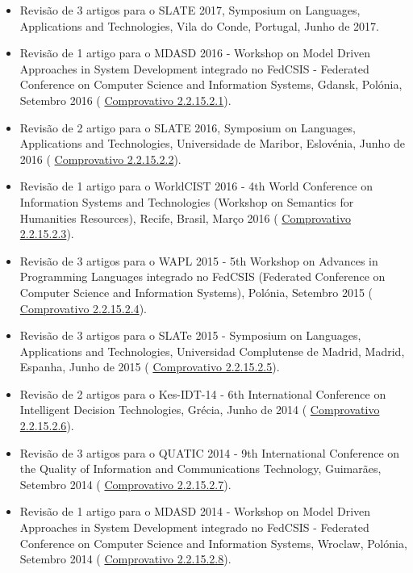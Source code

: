 \documentclass[11pt]{article}
\begin{document}
\begin{itemize}
\item{Revisão de 3 artigos para o SLATE 2017, Symposium on Languages, Applications and Technologies, Vila do Conde, Portugal, Junho de 2017.}
\item{Revisão de 1 artigo para o MDASD 2016 - Workshop on Model Driven Approaches in System Development integrado no FedCSIS - Federated Conference on Computer Science and Information Systems, Gdansk, Polónia, Setembro 2016 (
\href{run:ComprovativosCOCP/revisoes/MDASD2016.pdf}{Comprovativo 2.2.15.2.1}). }
\item{Revisão de 2 artigo para o SLATE 2016, Symposium on Languages, Applications and Technologies, Universidade de Maribor, Eslovénia, Junho de 2016 (
\href{run:ComprovativosCOCP/revisoes/SLATE2016.pdf}{Comprovativo 2.2.15.2.2}). }
\item{Revisão de 1 artigo para o WorldCIST 2016 - 4th World Conference on Information Systems and Technologies (Workshop on Semantics for Humanities Resources), Recife, Brasil, Março 2016 (
\href{run:ComprovativosCOCP/revisoes/WorldCisT2016.pdf}{Comprovativo 2.2.15.2.3}).}
\item{Revisão de 3 artigos para o WAPL 2015 - 5th Workshop on Advances in Programming Languages integrado no FedCSIS (Federated Conference on Computer Science and Information Systems), Polónia, Setembro 2015 (
\href{run:ComprovativosCOCP/revisoes/WAPL2015.pdf}{Comprovativo 2.2.15.2.4}).}
\item{Revisão de 3 artigos para o SLATe 2015 - Symposium on Languages, Applications and Technologies, Universidad Complutense de Madrid, Madrid, Espanha, Junho de 2015 (
\href{run:ComprovativosCOCP/revisoes/SLATE2015.pdf}{Comprovativo 2.2.15.2.5}).}
\item{Revisão de 2 artigos para o Kes-IDT-14 - 6th International Conference on Intelligent Decision Technologies, Grécia, Junho de 2014 (
\href{run:ComprovativosCOCP/revisoes/kesidt2014.pdf}{Comprovativo 2.2.15.2.6}).}
\item{Revisão de 3 artigos para o QUATIC 2014 - 9th International Conference on the Quality of Information and Communications Technology, Guimarães, Setembro 2014 (
\href{run:ComprovativosCOCP/revisoes/QUATIC2014.pdf}{Comprovativo 2.2.15.2.7}).}
\item{Revisão de 1 artigo para o MDASD 2014 - Workshop on Model Driven Approaches in System Development integrado no FedCSIS - Federated Conference on Computer Science and Information Systems, Wroclaw, Polónia, Setembro 2014 (
\href{run:ComprovativosCOCP/revisoes/MDASD2014.pdf}{Comprovativo 2.2.15.2.8}).}

\end{itemize}
\end{document}
